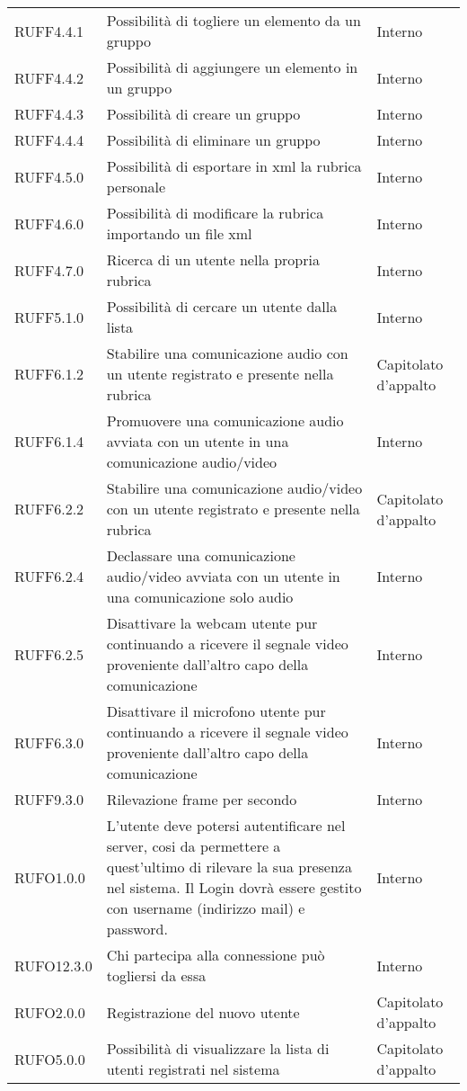 \begin{longtable}{lp{}l}
RUFF4.4.1 & Possibilità di togliere un elemento da un gruppo & Interno \\
RUFF4.4.2 & Possibilità di aggiungere un elemento in un gruppo & Interno \\
RUFF4.4.3 & Possibilità di creare un gruppo & Interno \\
RUFF4.4.4 & Possibilità di eliminare un gruppo & Interno \\
RUFF4.5.0 & Possibilità di esportare in xml la rubrica personale & Interno \\
RUFF4.6.0 & Possibilità di modificare la rubrica importando un file xml & Interno \\
RUFF4.7.0 & Ricerca di un utente nella propria rubrica & Interno \\
RUFF5.1.0 & Possibilità di cercare un utente dalla lista & Interno \\
RUFF6.1.2 & Stabilire una comunicazione audio con un utente registrato e presente nella rubrica & Capitolato d'appalto \\
RUFF6.1.4 & Promuovere una comunicazione audio avviata con un utente in una comunicazione audio/video & Interno \\
RUFF6.2.2 & Stabilire una comunicazione audio/video con un utente registrato e presente nella rubrica & Capitolato d'appalto \\
RUFF6.2.4 & Declassare una comunicazione audio/video avviata con un utente in una comunicazione solo audio & Interno \\
RUFF6.2.5 & Disattivare la webcam utente pur continuando a ricevere il segnale video proveniente dall'altro capo della comunicazione & Interno \\
RUFF6.3.0 & Disattivare il microfono utente pur continuando a ricevere il segnale video proveniente dall'altro capo della comunicazione & Interno \\
RUFF9.3.0 & Rilevazione frame per secondo & Interno \\
RUFO1.0.0 & L'utente deve potersi autentificare nel server, cosi da permettere a quest'ultimo di rilevare la sua presenza nel sistema. Il Login dovrà essere gestito con username (indirizzo mail) e password. & Interno \\
RUFO12.3.0 & Chi partecipa alla connessione può togliersi da essa & Interno \\
RUFO2.0.0 & Registrazione del nuovo utente & Capitolato d'appalto \\
RUFO5.0.0 & Possibilità di visualizzare la lista di utenti registrati nel sistema & Capitolato d'appalto \\

\end{longtable}
